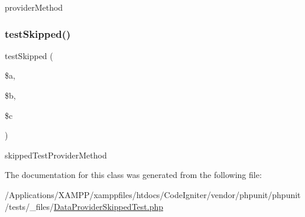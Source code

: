 provider\+Method \mbox{\label{class_data_provider_skipped_test_ad8fb7c4415043bb42ff9d93e37137d52}} 
\subsubsection{\texorpdfstring{test\+Skipped()}{testSkipped()}}
{\footnotesize\ttfamily test\+Skipped (\begin{DoxyParamCaption}\item[{}]{\$a,  }\item[{}]{\$b,  }\item[{}]{\$c }\end{DoxyParamCaption})}

skipped\+Test\+Provider\+Method 

The documentation for this class was generated from the following file\+:\begin{DoxyCompactItemize}
\item 
/\+Applications/\+X\+A\+M\+P\+P/xamppfiles/htdocs/\+Code\+Igniter/vendor/phpunit/phpunit/tests/\+\_\+files/\mbox{\hyperlink{_data_provider_skipped_test_8php}{Data\+Provider\+Skipped\+Test.\+php}}\end{DoxyCompactItemize}

